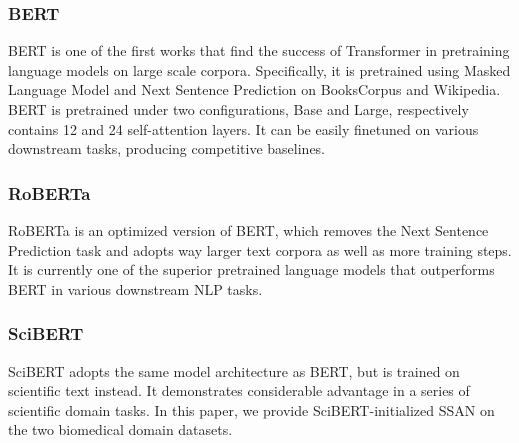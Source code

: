 \documentclass[letterpaper]{article} \usepackage{aaai21}  \usepackage{times}  \usepackage{helvet} \usepackage{courier}  \usepackage[hyphens]{url}  \usepackage{graphicx} \usepackage{booktabs}
\begin{document}
\subsubsection{BERT} BERT is one of the first works that find the success of Transformer in pretraining language models on large scale corpora.
Specifically, it is pretrained using Masked Language Model and Next Sentence Prediction on BooksCorpus and Wikipedia.
BERT is pretrained under two configurations, Base and Large, respectively contains 12 and 24 self-attention layers.
It can be easily finetuned on various downstream tasks, producing competitive baselines.
\subsubsection{RoBERTa} RoBERTa is an optimized version of BERT, which removes the Next Sentence Prediction task and adopts way larger text corpora as well as more training steps.
It is currently one of the superior pretrained language models that outperforms BERT in various downstream NLP tasks.
\subsubsection{SciBERT} SciBERT adopts the same model architecture as BERT, but is trained on scientific text instead.
It demonstrates considerable advantage in a series of scientific domain tasks.
In this paper, we provide SciBERT-initialized SSAN on the two biomedical domain datasets.
\end{document}
